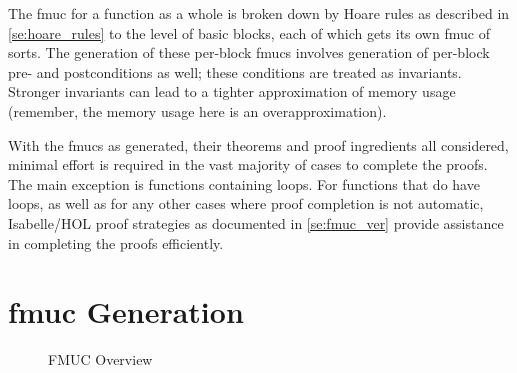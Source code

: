 The \ac{fmuc} for a function as a whole is broken down by Hoare rules%
as described in \cref{se:hoare_rules} to the level of basic blocks,
each of which gets its own \ac{fmuc} of sorts.
The generation of these per-block \acp{fmuc} involves generation of per-block
pre- and postconditions as well; these conditions are treated as invariants.%
%
%
Stronger invariants can lead to a tighter approximation of memory usage%
(remember, the memory usage here is an overapproximation).

With the \acp{fmuc} as generated, their theorems and proof ingredients all considered,
minimal effort is required in the vast majority of cases to complete the proofs.
The main exception is functions containing loops.
For functions that do have loops,%
as well as for any other cases where proof completion is not automatic,
Isabelle/HOL proof strategies as documented in \cref{se:fmuc_ver}%
provide assistance in completing the proofs efficiently.

\section{\acs*{fmuc} Generation}\label{se:fmuc_gen}
\begin{figure*}
  \centering
  \caption{FMUC Overview}\label{fig:overview}
\end{figure*}

